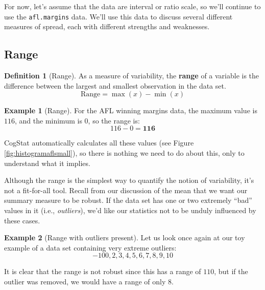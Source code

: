 \documentclass[
  11pt,
]{book}
\theoremstyle{definition}
\newtheorem{definition}{Definition}[chapter]
\theoremstyle{definition}
\newtheorem{example}{Example}[chapter]
\theoremstyle{definition}
\theoremstyle{definition}
\theoremstyle{remark}
\begin{document}
For now, let's assume that the data are interval or ratio scale, so we'll continue to use the \texttt{afl.margins} data. We'll use this data to discuss several different measures of spread, each with different strengths and weaknesses.

\hypertarget{range}{%
\subsection{Range}\label{range}}

\begin{definition}[Range]
\protect\hypertarget{def:defrange}{}\label{def:defrange}As a measure of variability, the \textbf{range} of a variable is the difference between the largest and smallest observation in the data set.
\[
\text{Range}=\max(x)-\min(x)
\]
\end{definition}

\begin{example}[Range]
\protect\hypertarget{exm:exrange}{}\label{exm:exrange}For the AFL winning margins data, the maximum value is \(116\), and the minimum is \(0\), so the range is:
\[116-0=\mathbf{116}\]
\end{example}

CogStat automatically calculates all these values (see Figure \ref{fig:histogramaflsmall}), so there is nothing we need to do about this, only to understand what it implies.

Although the range is the simplest way to quantify the notion of variability, it's not a fit-for-all tool. Recall from our discussion of the mean that we want our summary measure to be robust. If the data set has one or two extremely ``bad'' values in it (i.e., \emph{outliers}), we'd like our statistics not to be unduly influenced by these cases.

\begin{example}[Range with outliers present]
\protect\hypertarget{exm:exrange2}{}\label{exm:exrange2}Let us look once again at our toy example of a data set containing very extreme outliers:
\[
-100,2,3,4,5,6,7,8,9,10
\]

It is clear that the range is not robust since this has a range of \(110\), but if the outlier was removed, we would have a range of only \(8\).
\end{example}
\end{document}
